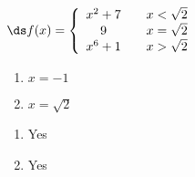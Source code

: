 {$\ds f(x) = \left\{\begin{array}{ccc}
x^2+7	& &  x<\sqrt{2}\\
9	& &  x=\sqrt{2}\\
x^6+1 & & x> \sqrt{2}
\end{array}\right.
$
\begin{enumerate}
\item		$x=-1$
\item		$x=\sqrt{2}$
\end{enumerate}
}
{\begin{enumerate}
\item		Yes
\item		Yes
\end{enumerate}
}
